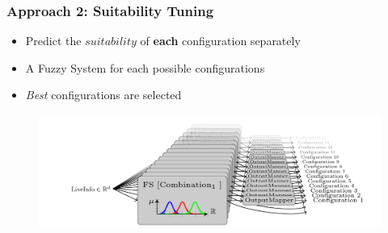 \documentclass[
	10pt,
	t		%
]{beamer}
\begin{document}
\begin{frame}
	\frametitle{Approach 2: Suitability Tuning}
	\begin{itemize}
		\item Predict the $suitability$ of \textbf{each} configuration separately
		\item A Fuzzy System for each possible configurations
		\item \textit{Best} configurations are selected
	\end{itemize}
	
	\begin{figure}
		\centering
		\includegraphics[width=1\textwidth]{figures/suitability-approach.png}
	\end{figure}
\end{frame}
\end{document}
